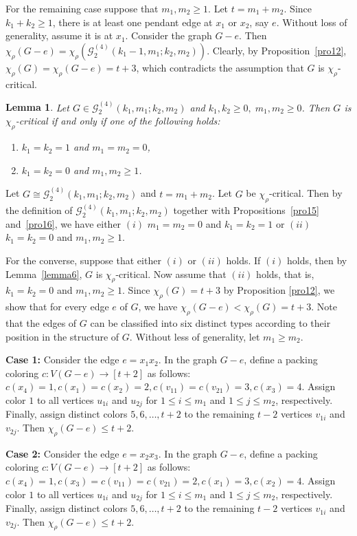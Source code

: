 \documentclass[12pt]{article}
\newtheorem{lemma}[theorem]{Lemma}
\newcommand{\proof}{\noindent{\bf Proof.\ }}
\newcommand{\ie}{that is}
\begin{document}
For the remaining case suppose that $m_1, m_2 \geq 1$. Let $t=m_1+m_2$. Since $k_1+k_2 \ge 1$, there is at least one pendant edge at $x_1$ or $x_2$, say $e$. 
Without loss of generality, assume it is at $x_1$.
Consider the graph $G-e$. Then $
\chi_\rho(G-e)=\chi_\rho(\mathcal{G}^{(4)}_2(k_1-1,m_1; k_2,m_2)).$ Clearly, by Proposition~\ref{pro12},  $\chi_\rho(G)= \chi_\rho(G-e) = t + 3$, which contradicts the assumption that $G$ is $\chi_\rho$-critical.


\begin{lemma}\label{pro13}
Let $G \in \mathcal{G}_{2}^{(4)}(k_{1},m_{1};k_{2},m_{2})$ and $k_1, k_2 \geq 0, \; m_1, m_2 \geq 0$.
Then $G$ is $\chi_\rho$-critical if and only if one of the following holds:
\begin{enumerate}
\item[(i)] $k_1=k_2=1$ and $m_1=m_2=0$,
\item[(ii)] $k_1=k_2=0$ and $m_1,m_2\ge 1$.
\end{enumerate}
\end{lemma}

\proof
Let $G \cong \mathcal{G}_{2}^{(4)}(k_{1},m_{1};k_{2},m_{2})$ and $t=m_1+m_2$. Let $G$ be $\chi_\rho$-critical. Then by the definition of $\mathcal{G}_{2}^{(4)}(k_{1},m_{1};k_{2},m_{2})$ together with Propositions~\ref{pro15} and~\ref{pro16}, we have either $(i)$ $m_1=m_2=0$ and $k_1=k_2=1$ or $(ii)$  $k_1=k_2=0$ and $m_1,m_2\ge 1$.
	
For the converse, suppose that either $(i)$ or $(ii)$ holds. 
If $(i)$ holds, then by Lemma~\ref{lemma6}, $G$ is $\chi_\rho$-critical. 
Now assume that $(ii)$ holds, \ie, $k_1 = k_2 = 0$ and $m_1, m_2 \ge 1$.
Since $\chi_\rho(G)=t+3$ by Proposition \ref{pro12},  we show that for every edge $e$ of $G$, we have $\chi_{\rho}(G-e) < \chi_{\rho}(G)=t+3$. Note that the edges of \(G\) can be classified into six distinct types according to their position in the structure of \(G\). Without less of generality, let $m_1 \geq m_2$.
	
\textbf{Case 1:} Consider the edge \( e = x_1x_2 \). In the graph \( G-e \), define a packing coloring \( c : V(G-e) \to [t+2] \) as follows:
$c(x_4) = 1, 
c(x_1) = c(x_2) = 2,
c(v_{11}) =  c(v_{21}) = 3,
c(x_3) = 4.$
Assign color \(1\) to all vertices \(u_{1i}\) and \(u_{2j}\) for \(1 \le i \le m_1\) and \(1 \le j \le m_2\), respectively. 
Finally, assign distinct colors \(5, 6, \dots, t+2\) to the remaining \(t-2\) vertices \(v_{1i}\) and \(v_{2j}\). Then \(\chi_\rho(G-e) \le t+2\).
	
\textbf{Case 2:} Consider the edge $e=x_2x_3$. In the graph \( G-e \), define a packing coloring \( c : V(G-e) \to [t+2] \) as follows:
$c(x_4)= 1, 
c(x_3)=c(v_{11})=c(v_{21})=2,
c(x_1) = 3,
c(x_2)=4.$
Assign color \(1\) to all vertices \(u_{1i}\) and \(u_{2j}\) for \(1 \le i \le m_1\) and \(1 \le j \le m_2\), respectively. 
Finally, assign distinct colors \(5, 6, \dots, t+2\) to the remaining \(t-2\) vertices \(v_{1i}\) and \(v_{2j}\). Then \(\chi_\rho(G-e) \le t+2\).
	
\end{document}
